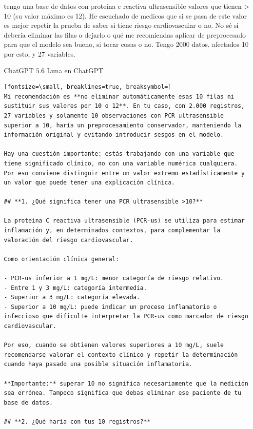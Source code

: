 \documentclass[12pt,a4paper,oneside]{book}
\begin{document}
\begin{iaprompt}
tengo una base de datos con proteina c reactiva ultrasensible valores que tienen > 10 (su valor máximo es 12). He escuchado de medicos que si se pasa de este valor es mejor repetir la prueba de saber si tiene riesgo cardiovascular o no. No sé si debería eliminar las filas o dejarlo o qué me recomiendas aplicar de preprocesado para que el modelo sea bueno, si tocar cosas o no. Tengo 2000 datos, afectados 10 por esto, y 27 variables.
\end{iaprompt}
\begin{iaresp}{ChatGPT 5.6 Luna en ChatGPT}
\begin{Verbatim}[fontsize=\small, breaklines=true, breaksymbol=]
Mi recomendación es **no eliminar automáticamente esas 10 filas ni sustituir sus valores por 10 o 12**. En tu caso, con 2.000 registros, 27 variables y solamente 10 observaciones con PCR ultrasensible superior a 10, haría un preprocesamiento conservador, manteniendo la información original y evitando introducir sesgos en el modelo.

Hay una cuestión importante: estás trabajando con una variable que tiene significado clínico, no con una variable numérica cualquiera. Por eso conviene distinguir entre un valor extremo estadísticamente y un valor que puede tener una explicación clínica.

## **1. ¿Qué significa tener una PCR ultrasensible >10?**

La proteína C reactiva ultrasensible (PCR-us) se utiliza para estimar inflamación y, en determinados contextos, para complementar la valoración del riesgo cardiovascular.

Como orientación clínica general:

- PCR-us inferior a 1 mg/L: menor categoría de riesgo relativo.
- Entre 1 y 3 mg/L: categoría intermedia.
- Superior a 3 mg/L: categoría elevada.
- Superior a 10 mg/L: puede indicar un proceso inflamatorio o infeccioso que dificulte interpretar la PCR-us como marcador de riesgo cardiovascular.

Por eso, cuando se obtienen valores superiores a 10 mg/L, suele recomendarse valorar el contexto clínico y repetir la determinación cuando haya pasado una posible situación inflamatoria.

**Importante:** superar 10 no significa necesariamente que la medición sea errónea. Tampoco significa que debas eliminar ese paciente de tu base de datos.

## **2. ¿Qué haría con tus 10 registros?**


\end{Verbatim}
\end{iaresp}
\end{document}
